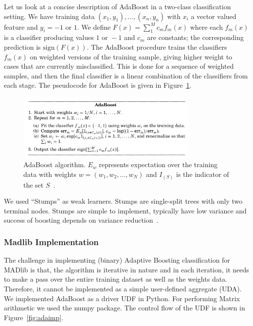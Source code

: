 Let us look at a concise description of AdaBoost in a two-class classification setting. We have training data $(x_1, y_1), \ldots, (x_n, y_n)$ with $x_i$ a vector valued feature and $y_i = -1\text{ or }1$. We define $F(x) = \sum_1^M{c_mf_m(x)}$ where each $f_m(x)$ is a classifier producing values $1\text{ or }-1$ and $c_m$ are constants; the corresponding prediction is $\text{sign}(F(x))$. The AdaBoost procedure trains the classifiers $f_m(x)$ on weighted versions of the training sample, giving higher weight to cases that are currently misclassified. This is done for a sequence of weighted samples, and then the final classifier is a linear combination of the classifiers from each stage. The pseudocode for AdaBoost is given in Figure~\ref{fig:adaproc}.

\begin{figure}[ht]
\centering
\includegraphics[width=0.8\textwidth]{ada.png}
\caption{AdaBoost algorithm. $E_w$ represents expectation over the training data with weights $w=(w_1,w_2,\ldots,w_N)$ and $I_{(S)}$ is the indicator of the set $S$~\cite{alr00}.}
\label{fig:adaproc}
\end{figure}

We used ``Stumps'' as weak learners. Stumps are single-split trees with only two terminal nodes. Stumps are simple to implement, typically have low variance and success of boosting depends on variance reduction~\cite{alr00}.

\subsubsection{Madlib Implementation}
The challenge in implementing (binary) Adaptive Boosting classification for MADlib is that, the algorithm is iterative in nature and in each iteration, it needs to make a pass over the entire training dataset as well as the weights data. Therefore, it cannot be implemented as a simple user-defined aggregate (UDA). We implemented AdaBoost as a driver UDF in Python. For performing Matrix arithmetic we used the {\ttfamily numpy} package. The control flow of the UDF is shown in Figure~\ref{fig:adaimp}.

